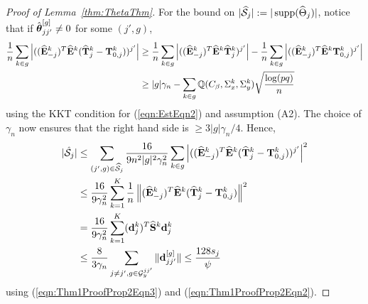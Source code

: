 \begin{proof}[Proof of Lemma~\ref{thm:ThetaThm}]
For the bound on $| \widehat {{\cal{S}}}_j| := |\operatorname*{supp}( \widehat \Theta_j)|$, notice that if $\hat {{\boldsymbol{\theta}}}_{jj'}^{[g]} \neq 0$ for some $(j',g)$,
%
\begin{align*}
\frac{1}{n} \sum_{k \in g} \left| ((\widehat {{\mathbf{E}}}_{-j}^k)^T \widehat {{\mathbf{E}}}^k ( \widehat {{\mathbf{T}}}_j^k - {\mathbf{T}}_{0,j}^k ))^{j'} \right| & \geq
\frac{1}{n} \sum_{k \in g} \left| ((\widehat {{\mathbf{E}}}_{-j}^k)^T \widehat {{\mathbf{E}}}^k \widehat {{\mathbf{T}}}_j^k )^{j'} \right| - \frac{1}{n} \sum_{k \in g} \left| ((\widehat {{\mathbf{E}}}_{-j}^k)^T \widehat {{\mathbf{E}}}^k {\mathbf{T}}_{0,j}^k )^{j'} \right|\\
& \geq |g| \gamma_n - \sum_{k \in g} {\mathbb{Q}} ( C_\beta, \Sigma_x^k, \Sigma_y^k ) \sqrt{ \frac{ \log (pq)}{n}}
\end{align*}
%
using the KKT condition for (\ref{eqn:EstEqn2}) and assumption (A2). The choice of $\gamma_n$ now ensures that the right hand side is $\geq 3|g| \gamma_n / 4$. Hence,
%
\begin{align*}
| \hat {{\cal{S}}}_j| & \leq \sum_{(j',g) \in \widehat {{\cal{S}}}_j} \frac{16}{9 n^2 |g|^2 \gamma_n^2 } \sum_{k \in g} \left| ((\widehat {{\mathbf{E}}}_{-j}^k)^T \widehat {{\mathbf{E}}}^k ( \widehat {{\mathbf{T}}}_j^k - {\mathbf{T}}_{0,j}^k ))^{j'} \right|^2\\
& \leq \frac{16}{9 \gamma_n^2} \sum_{k=1}^K \frac{1}{n} \left\| (\widehat {{\mathbf{E}}}_{-j}^k)^T \widehat {{\mathbf{E}}}^k ( \widehat {{\mathbf{T}}}_j^k - {\mathbf{T}}_{0,j}^k ) \right\|^2 \\
& = \frac{16}{9 \gamma_n^2} \sum_{k=1}^K ({\bf{d}}_j^k)^T \widehat {{\mathbf{S}}}^k {\bf{d}}_j^k \\
& \leq \frac{8}{3 \gamma_n} \sum_{j \neq j', g \in {\cal{G}}_y^{jj'}} \| {\bf{d}}_{jj'}^{[g]} \| \leq \frac{128 s_j}{\psi} 
\end{align*}
%
using (\ref{eqn:Thm1ProofProp2Eqn3}) and (\ref{eqn:Thm1ProofProp2Eqn2}).


\end{proof}
